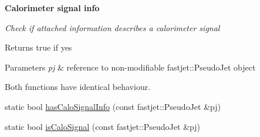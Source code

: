 \begin{Indent}{\bf Calorimeter signal info}\par
{\em Check if attached information describes a calorimeter signal

\begin{DoxyReturn}{Returns}
{\ttfamily true} if yes
\end{DoxyReturn}

\begin{DoxyParams}{Parameters}
{\em pj} & reference to non-\/modifiable {\ttfamily fastjet\+::\+Pseudo\+Jet} object\\
\hline
\end{DoxyParams}
Both functions have identical behaviour. }\begin{DoxyCompactItemize}
\item 
static bool \hyperlink{structAnalysisHelper_1_1FastJet_a78dd1bc2743d8a94b8b80a4f1749f3b2}{has\+Calo\+Signal\+Info} (const fastjet\+::\+Pseudo\+Jet \&pj)
\item 
static bool \hyperlink{structAnalysisHelper_1_1FastJet_aafc1a2a0d61a011325f5e7e90de2f5e7}{is\+Calo\+Signal} (const fastjet\+::\+Pseudo\+Jet \&pj)
\end{DoxyCompactItemize}
\end{Indent}
